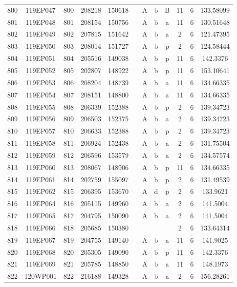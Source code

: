 \begin{tabular}{|*{12}{c|}}
800 & 119EP047 & 800 & 208218 & 150618 &  & A & b & B & 11 & 6 & 133.58099 \\ 
801 & 119EP048 & 801 & 208154 & 150756 &  & A & b & a & 11 & 6 & 130.51648 \\ 
802 & 119EP049 & 802 & 207815 & 151642 &  & A & b & a & 2 & 6 & 121.47395 \\ 
803 & 119EP050 & 803 & 208014 & 151727 &  & A & b & p & 2 & 6 & 124.58444 \\ 
804 & 119EP051 & 804 & 205516 & 149038 &  & A & b & p & 11 & 6 & 142.3376 \\ 
805 & 119EP052 & 805 & 202807 & 148922 &  & A & b & p & 11 & 6 & 153.10641 \\ 
806 & 119EP053 & 806 & 208204 & 148739 &  & A & b & a & 11 & 6 & 134.66335 \\ 
807 & 119EP054 & 807 & 208151 & 148800 &  & A & b & a & 11 & 6 & 134.66335 \\ 
808 & 119EP055 & 808 & 206339 & 152388 &  & A & b & p & 2 & 6 & 139.34723 \\ 
809 & 119EP056 & 809 & 206503 & 152375 &  & A & b & a & 2 & 6 & 139.34723 \\ 
810 & 119EP057 & 810 & 206633 & 152388 &  & A & b & p & 2 & 6 & 139.34723 \\ 
811 & 119EP058 & 811 & 206924 & 152438 &  & A & b & a & 2 & 6 & 131.75504 \\ 
812 & 119EP059 & 812 & 206596 & 153579 &  & A & b & a & 2 & 6 & 134.57574 \\ 
813 & 119EP060 & 813 & 208067 & 148906 &  & A & b & p & 11 & 6 & 134.66335 \\ 
814 & 119EP061 & 814 & 202759 & 155097 &  & A & b & p & 2 & 6 & 131.49539 \\ 
815 & 119EP062 & 815 & 206395 & 153670 &  & A & d & p & 2 & 6 & 133.9621 \\ 
816 & 119EP064 & 816 & 205115 & 149960 &  & A & b & a & 2 & 6 & 141.5004 \\ 
817 & 119EP065 & 817 & 204795 & 150090 &  & A & b & a & 2 & 6 & 141.5004 \\ 
818 & 119EP066 & 818 & 205685 & 150380 &  &  &  &  & 2 & 6 & 133.64314 \\ 
819 & 119EP067 & 819 & 204755 & 149140 &  & A & b & a & 11 & 6 & 141.9025 \\ 
820 & 119EP068 & 820 & 205305 & 149090 &  & A & b & p & 11 & 6 & 142.3376 \\ 
821 & 119EP069 & 821 & 205785 & 148850 &  & A & b & a & 11 & 6 & 148.1973 \\ 
822 & 120WP001 & 822 & 216188 & 149328 &  & A & b & a & 2 & 6 & 156.28261 \\ 

\end{tabular}
